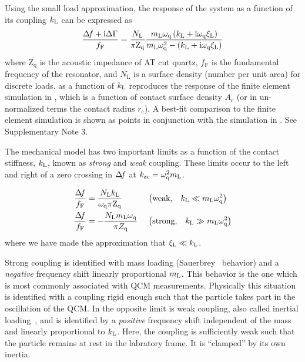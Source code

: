 Using the small load approximation, the response of the system as a
function of its coupling $k_\mathrm{L}$ can be expressed
as~\cite{steinem2007piezoelectric}
\begin{equation}
\frac{\Delta\!f + {\mathrm{i}} \Delta\Gamma}{f_\mathrm{F}} = \frac{N_\mathrm{L}}{\pi
\mathrm{Z}_\mathrm{q}}
\frac{m_\mathrm{L} \omega_\mathrm{q} \left( k_\mathrm{L} + {\mathrm{i}}
\omega_\mathrm{q} \xi_\mathrm{L}\right) }
{m_\mathrm{L} \omega_\mathrm{q}^2 - \left(k_\mathrm{L} + {\mathrm{i}}
\omega_\mathrm{q} \xi_\mathrm{L}\right)}
\label{eqn:mastereq}
\end{equation}
where $\mathrm{Z}_\mathrm{q}$ is the acoustic impedance of AT cut quartz,
$f_\mathrm{F}$ is the fundamental frequency of the resonator, and
$N_\mathrm{L}$ is a surface density (number per unit area) for discrete
loads.   as a function of $k_\mathrm{L}$ reproduces the
response of the finite element simulation in ,
which is a function of contact surface density $A_\mathrm{c}$ (or in
un-normalized terms the contact radius $r_\mathrm{c}$).  A best-fit comparison to 
the finite element simulation is shown as points in conjunction with the simulation
in .  See Supplementary Note 3.

The mechanical model has two important limits as a function of the contact
stiffness, $k_\mathrm{L}$, known as \textit{strong} and \textit{weak}
coupling.  These limits occur to the left and right of a zero crossing in $\Delta\!f$ at
$k_\mathrm{zc}=\omega_\mathrm{q}^2 m_\mathrm{L}$.

\vspace{-\baselineskip}
\vspace{-\parskip}
\begin{align}
\frac{\Delta\!f}{f_\mathrm{F}}&= 
\frac{N_\mathrm{L} k_\mathrm{L}}
{\omega_\mathrm{q}\pi \mathrm{Z}_\mathrm{q}}
&\,&\left(\text{weak,}\quad k_\mathrm{L}\ll m_\mathrm{L}
\omega_\mathrm{q}^2\right)
\label{eqn:couplinguy1}
\\
\frac{\Delta\!f}{f_\mathrm{F}}&=  -\frac{N_\mathrm{L}
m_\mathrm{L} \omega_\mathrm{q}}{\pi Z_\mathrm{q}}
&\,&\left(\text{strong,}\quad k_\mathrm{L}\gg m_\mathrm{L}
\omega_\mathrm{q}^2\right)
\label{eqn:couplinguy2}
\end{align}
where we have made the approximation that
$\xi_\mathrm{L}\ll k_\mathrm{L}$.~\cite{steinem2007piezoelectric}


Strong coupling is identified with mass loading
(Sauerbrey~\cite{sauerbrey1959verwendung} behavior) and a \textit{negative}
frequency shift linearly proportional $m_\mathrm{L}$.  This behavior is the
one which is most commonly associated with QCM measurements.  Physically
this situation is identified with a coupling rigid enough such that
the particle takes part in the oscillation of the QCM.
In the
opposite limit is weak coupling, also called inertial
loading~\cite{dybwad1985sensitive}, and is identified by a \textit{positive}
frequency shift independent of the mass and linearly proportional
to $k_\mathrm{L}$.  Here, the coupling is sufficiently weak such that the particle
remains at rest in the labratory frame.  It is ``clamped'' by its own
inertia.~\cite{du2008role}

